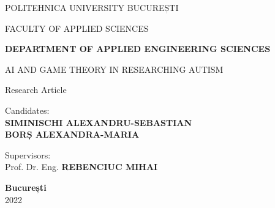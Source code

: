 \begin{titlepage}
    \begin{center}
        \Large
        \MakeUppercase{Politehnica University București}
        
        \Large
        \MakeUppercase{Faculty of Applied Sciences}
        
        \Large
        \textbf{\MakeUppercase{Department of Applied Engineering Sciences}}
        
        \vspace{1cm}
        
        \vspace{3cm}
        \LARGE
        \MakeUppercase{AI AND GAME THEORY IN RESEARCHING AUTISM}
        
        \vspace{0.5cm}
        \Large
        Research Article
        
        \vspace{3cm}
        \begin{flushright}
            Candidates:\\
            \textbf{\MakeUppercase{Siminischi Alexandru-Sebastian}}\\
            \textbf{\MakeUppercase{Borș Alexandra-Maria}}
        \end{flushright}
        \vspace{.5cm}
        \begin{flushleft}
        Supervisors:\\
        Prof. Dr. Eng. \textbf{\MakeUppercase{Rebenciuc Mihai}}\\
        \end{flushleft}
        
        \vfill
        \Large
        \textbf{București\\}
        \Large
        2022
    \end{center}
\end{titlepage}